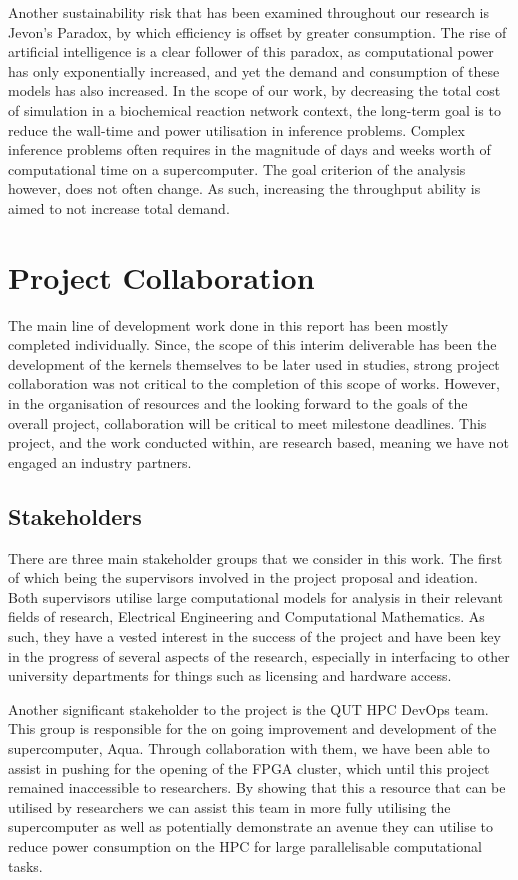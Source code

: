 \documentclass[11pt, a4paper]{article}
\begin{document}
	Another sustainability risk that has been examined throughout our research is Jevon's Paradox, by which efficiency is offset by greater consumption. The rise of artificial intelligence is a clear follower of this paradox, as computational power has only exponentially increased, and yet the demand and consumption of these models has also increased. In the scope of our work, by decreasing the total cost of simulation in a biochemical reaction network context, the long-term goal is to reduce the wall-time and power utilisation in inference problems. Complex inference problems often requires in the magnitude of days and weeks worth of computational time on a supercomputer. The goal criterion of the analysis however, does not often change. As such, increasing the throughput ability is aimed to not increase total demand. 
	
	\section{Project Collaboration}
	The main line of development work done in this report has been mostly completed individually. Since, the scope of this interim deliverable has been the development of the kernels themselves to be later used in studies, strong project collaboration was not critical to the completion of this scope of works. However, in the organisation of resources and the looking forward to the goals of the overall project, collaboration will be critical to meet milestone deadlines. This project, and the work conducted within, are research based, meaning we have not engaged an industry partners.
	
	\subsection{Stakeholders}
	There are three main stakeholder groups that we consider in this work. The first of which being the supervisors involved in the project proposal and ideation. Both supervisors utilise large computational models for analysis in their relevant fields of research, Electrical Engineering and Computational Mathematics. As such, they have a vested interest in the success of the project and have been key in the progress of several aspects of the research, especially in interfacing to other university departments for things such as licensing and hardware access. 
	
	Another significant stakeholder to the project is the QUT HPC DevOps team. This group is responsible for the on going improvement and development of the supercomputer, Aqua. Through collaboration with them, we have been able to assist in pushing for the opening of the FPGA cluster, which until this project remained inaccessible to researchers. By showing that this a resource that can be utilised by researchers we can assist this team in more fully utilising the supercomputer as well as potentially demonstrate an avenue they can utilise to reduce power consumption on the HPC for large parallelisable computational tasks. 
	
\end{document}
